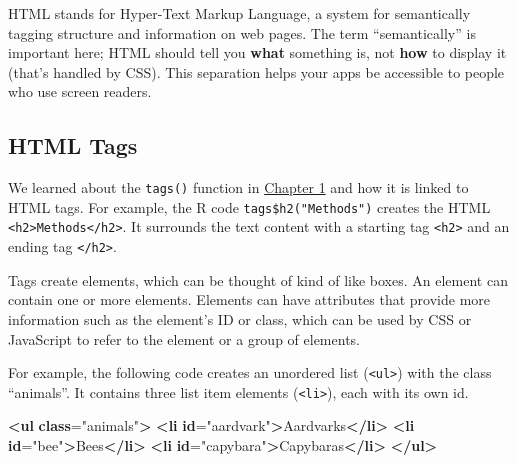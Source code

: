 \documentclass[
]{book}
\newenvironment{Shaded}{\begin{snugshade}}{\end{snugshade}}
\newcommand{\ErrorTok}[1]{\textcolor[rgb]{0.64,0.00,0.00}{\textbf{#1}}}
\newcommand{\KeywordTok}[1]{\textcolor[rgb]{0.13,0.29,0.53}{\textbf{#1}}}
\newcommand{\NormalTok}[1]{#1}
\newcommand{\OtherTok}[1]{\textcolor[rgb]{0.56,0.35,0.01}{#1}}
\newcommand{\StringTok}[1]{\textcolor[rgb]{0.31,0.60,0.02}{#1}}
\begin{document}
HTML stands for Hyper-Text Markup Language, a system for semantically tagging structure and information on web pages. The term ``semantically'' is important here; HTML should tell you \textbf{what} something is, not \textbf{how} to display it (that's handled by CSS). This separation helps your apps be accessible to people who use screen readers.

\hypertarget{html-tags}{%
\subsection{HTML Tags}\label{html-tags}}

We learned about the \texttt{tags()} function in \protect\hyperlink{tags}{Chapter 1} and how it is linked to HTML tags. For example, the R code \texttt{tags\$h2("Methods")} creates the HTML \texttt{\textless{}h2\textgreater{}Methods\textless{}/h2\textgreater{}}. It surrounds the text content with a starting tag \texttt{\textless{}h2\textgreater{}} and an ending tag \texttt{\textless{}/h2\textgreater{}}.

Tags create elements, which can be thought of kind of like boxes. An element can contain one or more elements. Elements can have attributes that provide more information such as the element's ID or class, which can be used by CSS or JavaScript to refer to the element or a group of elements.

For example, the following code creates an unordered list (\texttt{\textless{}ul\textgreater{}}) with the class ``animals''. It contains three list item elements (\texttt{\textless{}li\textgreater{}}), each with its own id.

\begin{Shaded}
\begin{Highlighting}[]
\KeywordTok{\textless{}ul} \ErrorTok{class}\OtherTok{=}\StringTok{"animals"}\KeywordTok{\textgreater{}}
    \KeywordTok{\textless{}li} \ErrorTok{id}\OtherTok{=}\StringTok{"aardvark"}\KeywordTok{\textgreater{}}\NormalTok{Aardvarks}\KeywordTok{\textless{}/li\textgreater{}}
    \KeywordTok{\textless{}li} \ErrorTok{id}\OtherTok{=}\StringTok{"bee"}\KeywordTok{\textgreater{}}\NormalTok{Bees}\KeywordTok{\textless{}/li\textgreater{}}
    \KeywordTok{\textless{}li} \ErrorTok{id}\OtherTok{=}\StringTok{"capybara"}\KeywordTok{\textgreater{}}\NormalTok{Capybaras}\KeywordTok{\textless{}/li\textgreater{}}
\KeywordTok{\textless{}/ul\textgreater{}}
\end{Highlighting}
\end{Shaded}
\end{document}
